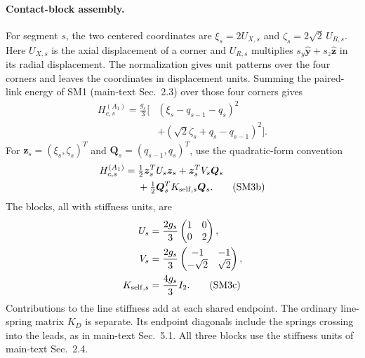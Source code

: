 \documentclass[10pt,aps,onecolumn,notitlepage,nofootinbib]{revtex4-2}
\begin{document}
\paragraph*{Contact-block assembly.}
For segment $s$, the two centered coordinates are $\xi_s=2U_{X,s}$ and
$\zeta_s=2\sqrt{2}\,U_{R,s}$. Here $U_{X,s}$ is the axial displacement
of a corner and $U_{R,s}$ multiplies $s_y\hat{\bm y}+s_z\hat{\bm z}$ in
its radial displacement. The normalization gives unit patterns over
the four corners and leaves the coordinates in displacement units.
Summing the paired-link energy of SM1 (main-text Sec.~2.3) over those
four corners gives
\begin{align}
 H_{c,s}^{(A_1)}=\frac{g_s}{3}\big[&
 (\xi_s-q_{s-1}-q_s)^2\nonumber\\[-2pt]
 &+(\sqrt2\zeta_s+q_s-q_{s-1})^2\big].
 \tag{SM3a}
 \label{eq:s5-segment-energy}
\end{align}
For $\bm z_s=(\xi_s,\zeta_s)^T$ and $\bm Q_s=(q_{s-1},q_s)^T$, use the quadratic-form convention
\begin{align}
 H_{c,s}^{(A_1)}={}&\tfrac12\bm z_s^TU_s\bm z_s
 +\bm z_s^TV_s\bm Q_s\nonumber\\
 &+\tfrac12\bm Q_s^TK_{{\rm self},s}\bm Q_s.
 \tag{SM3b}
 \label{eq:s5-segment-quadratic}
\end{align}
The blocks, all with stiffness units, are
\begin{align}
 U_s&=\frac{2g_s}{3}
 \begin{pmatrix}1&0\\0&2\end{pmatrix},\nonumber\\
 V_s&=\frac{2g_s}{3}
 \begin{pmatrix}-1&-1\\-\sqrt2&\sqrt2\end{pmatrix},\nonumber\\
 K_{{\rm self},s}&=\frac{4g_s}{3}I_2.
 \tag{SM3c}
 \label{eq:s5-segment-hessian}
\end{align}
Contributions to the line stiffness add at each shared endpoint. The ordinary
line-spring matrix $K_D$ is separate. Its endpoint diagonals include the
springs crossing into the leads, as in main-text Sec.~5.1. All three
blocks use the stiffness units of main-text Sec.~2.4.
\end{document}
